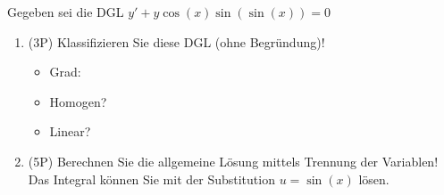 Gegeben sei die DGL $y' + y \cos(x) \sin(\sin(x)) = 0$

\begin{enumerate}[label=(\alph*)]

	\item (3P) Klassifizieren Sie diese DGL (ohne Begründung)!

	\bigskip

		\begin{itemize}
			\item Grad:	\bigskip	
			\item Homogen? \bigskip	
			\item Linear? \bigskip	
		\end{itemize}

	\bigskip

	\item (5P) Berechnen Sie die allgemeine Lösung mittels Trennung der Variablen! Das Integral können Sie mit der Substitution $u=\sin(x)$ lösen.

\end{enumerate}
